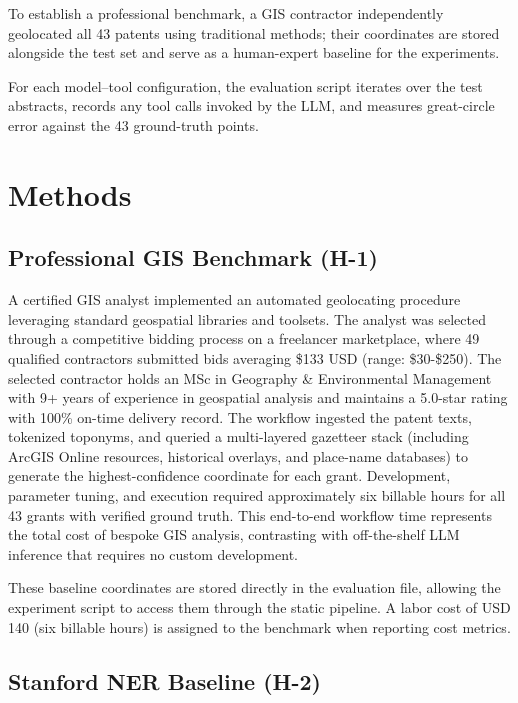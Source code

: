 To establish a professional benchmark, a GIS contractor independently
geolocated all 43 patents using traditional methods; their coordinates
are stored alongside the test set and serve as a human-expert baseline
for the experiments.

For each model--tool configuration, the evaluation script iterates over
the test abstracts, records any tool calls invoked by the LLM, and
measures great-circle error against the 43 ground-truth points.

\section{Methods}\label{methods}

\subsection{Professional GIS Benchmark
(H-1)}\label{professional-gis-benchmark-h-1}

A certified GIS analyst \citep{Bashorun2025_gis} implemented an
automated geolocating procedure leveraging standard geospatial libraries
and toolsets. The analyst was selected through a competitive bidding
process on a freelancer marketplace, where 49 qualified contractors
submitted bids averaging \$133 USD (range: \$30-\$250). The selected
contractor holds an MSc in Geography \& Environmental Management with 9+
years of experience in geospatial analysis and maintains a 5.0-star
rating with 100\% on-time delivery record. The workflow ingested the
patent texts, tokenized toponyms, and queried a multi-layered gazetteer
stack (including ArcGIS Online resources, historical overlays, and
place-name databases) to generate the highest-confidence coordinate for
each grant. Development, parameter tuning, and execution required
approximately six billable hours for all 43 grants with verified ground
truth. This end-to-end workflow time represents the total cost of
bespoke GIS analysis, contrasting with off-the-shelf LLM inference that
requires no custom development.

These baseline coordinates are stored directly in the evaluation file,
allowing the experiment script to access them through the static
pipeline. A labor cost of USD 140 (six billable hours) is assigned to
the benchmark when reporting cost metrics.

\subsection{Stanford NER Baseline
(H-2)}\label{stanford-ner-baseline-h-2}

